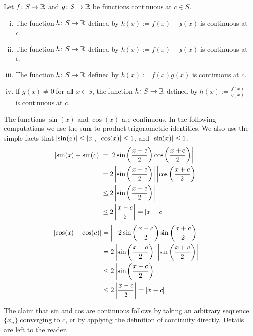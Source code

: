 \begin{prop} \label{contalg:prop}
Let $f \colon S \to {\mathbb{R}}$ and $g \colon S \to {\mathbb{R}}$ be functions
continuous at $c \in S$.
\begin{enumerate}[(i)]
\item The function $h \colon S \to {\mathbb{R}}$ defined by
$h(x) := f(x)+g(x)$ is continuous at $c$.
\item The function $h \colon S \to {\mathbb{R}}$ defined by
$h(x) := f(x)-g(x)$ is continuous at $c$.
\item The function $h \colon S \to {\mathbb{R}}$ defined by
$h(x) := f(x)g(x)$ is continuous at $c$.
\item If $g(x)\not=0$ for all $x \in S$, the function $h \colon S \to {\mathbb{R}}$
defined by $h(x) := \frac{f(x)}{g(x)}$ is continuous at $c$.
\end{enumerate}
\end{prop}

\begin{example} \label{sincos:example}
The functions $\sin(x)$ and $\cos(x)$ are continuous.
In the following computations we use the sum-to-product
trigonometric identities.  We also use the simple facts that
$\left\lvert {\sin(x)} \right\rvert \leq \left\lvert {x} \right\rvert$, $\left\lvert {\cos(x)} \right\rvert \leq 1$,
and $\left\lvert {\sin(x)} \right\rvert \leq 1$.
\begin{equation*}
\begin{split}
\left\lvert {\sin(x)-\sin(c)} \right\rvert & =
\left\lvert {
2 \sin \left( \frac{x-c}{2} \right) \cos \left( \frac{x+c}{2} \right)
} \right\rvert
\\
& =
2
\left\lvert { \sin \left( \frac{x-c}{2} \right) } \right\rvert
\left\lvert { \cos \left( \frac{x+c}{2} \right) } \right\rvert
\\
& \leq
2
\left\lvert { \sin \left( \frac{x-c}{2} \right) } \right\rvert
\\
& \leq
2
\left\lvert { \frac{x-c}{2} } \right\rvert
= \left\lvert {x-c} \right\rvert
\end{split}
\end{equation*}
\begin{equation*}
\begin{split}
\left\lvert {\cos(x)-\cos(c)} \right\rvert & =
\left\lvert {
-2 \sin \left( \frac{x-c}{2} \right) \sin \left( \frac{x+c}{2} \right)
} \right\rvert
\\
& =
2
\left\lvert { \sin \left( \frac{x-c}{2} \right) } \right\rvert
\left\lvert { \sin \left( \frac{x+c}{2} \right) } \right\rvert
\\
& \leq
2
\left\lvert { \sin \left( \frac{x-c}{2} \right) } \right\rvert
\\
& \leq
2
\left\lvert { \frac{x-c}{2} } \right\rvert
= \left\lvert {x-c} \right\rvert
\end{split}
\end{equation*}

The claim that sin and cos are continuous follows by taking an
arbitrary sequence $\{ x_n \}$ converging to $c$, or by applying the
definition of continuity directly.  Details are left to the
reader.
\end{example}

